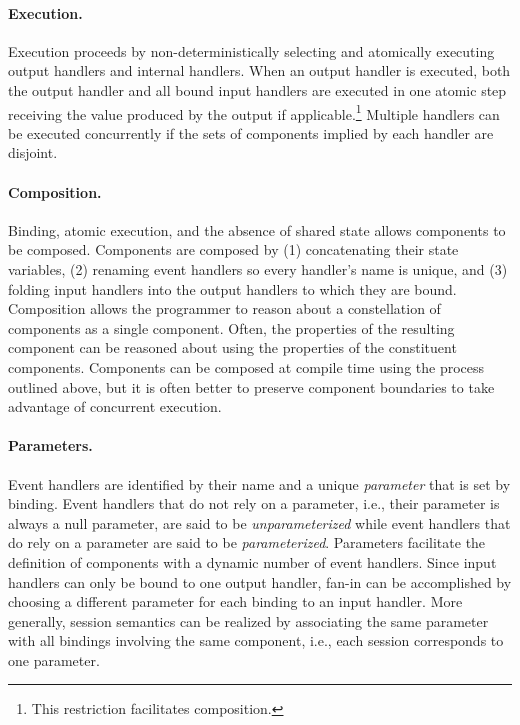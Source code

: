 \paragraph{Execution.}
Execution proceeds by non-deterministically selecting and atomically executing output handlers and internal handlers.
When an output handler is executed, both the output handler and all bound input handlers are executed in one atomic step receiving the value produced by the output if applicable.\footnote{This restriction facilitates composition.}
Multiple handlers can be executed concurrently if the sets of components implied by each handler are disjoint.

\paragraph{Composition.}
Binding, atomic execution, and the absence of shared state allows components to be composed.
Components are composed by (1) concatenating their state variables, (2) renaming event handlers so every handler's name is unique, and (3) folding input handlers into the output handlers to which they are bound.
Composition allows the programmer to reason about a constellation of components as a single component.
Often, the properties of the resulting component can be reasoned about using the properties of the constituent components.
Components can be composed at compile time using the process outlined above, but it is often better to preserve component boundaries to take advantage of concurrent execution.

\paragraph{Parameters.}
Event handlers are identified by their name and a unique \emph{parameter} that is set by binding.
Event handlers that do not rely on a parameter, i.e., their parameter is always a null parameter, are said to be \emph{unparameterized} while event handlers that do rely on a parameter are said to be \emph{parameterized}.
Parameters facilitate the definition of components with a dynamic number of event handlers.
Since input handlers can only be bound to one output handler, fan-in can be accomplished by choosing a different parameter for each binding to an input handler.
More generally, session semantics can be realized by associating the same parameter with all bindings involving the same component, i.e., each session corresponds to one parameter.

